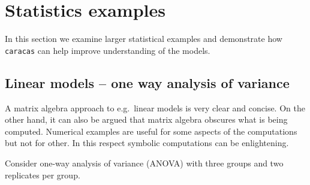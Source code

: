 \documentclass[10pt,]{article}
\newenvironment{Shaded}{\begin{snugshade}}{\end{snugshade}}
\newcommand{\CommentTok}[1]{\textcolor[rgb]{0.56,0.35,0.01}{\textit{#1}}}
\newcommand{\DataTypeTok}[1]{\textcolor[rgb]{0.13,0.29,0.53}{#1}}
\newcommand{\DecValTok}[1]{\textcolor[rgb]{0.00,0.00,0.81}{#1}}
\newcommand{\KeywordTok}[1]{\textcolor[rgb]{0.13,0.29,0.53}{\textbf{#1}}}
\newcommand{\NormalTok}[1]{#1}
\newcommand{\OperatorTok}[1]{\textcolor[rgb]{0.81,0.36,0.00}{\textbf{#1}}}
\newcommand{\StringTok}[1]{\textcolor[rgb]{0.31,0.60,0.02}{#1}}
\begin{document}
\hypertarget{sec:statistics}{%
\section{Statistics examples}\label{sec:statistics}}

In this section we examine larger statistical examples and demonstrate
how \texttt{caracas} can help improve understanding of the models.

\hypertarget{one-way}{%
\subsection{Linear models -- one way analysis of
variance}\label{one-way}}

A matrix algebra approach to e.g.~linear models is very clear and
concise. On the other hand, it can also be argued that matrix algebra
obscures what is being computed. Numerical examples are useful for some
aspects of the computations but not for other. In this respect symbolic
computations can be enlightening.

Consider one-way analysis of variance (ANOVA) with three groups and two
replicates per group.

\begin{Shaded}
\end{Shaded}
\end{document}
